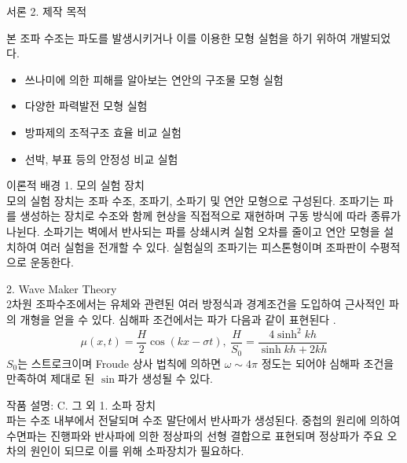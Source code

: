 \documentclass[Junlampaper, portrait]{Julam_PosterK}
\begin{document}
\begin{poster}
\begin{posterbox}[name=intro,column=0]{서론}
    \small {2. 제작 목적} \\
        \scriptsize {본 조파 수조는 파도를 발생시키거나 이를 이용한 모형 실험을 하기 위하여 개발되었다. 
          \begin{itemize}
            \item 쓰나미에 의한 피해를 알아보는 연안의 구조물 모형 실험
            \item 다양한 파력발전 모형 실험
            \item 방파제의 조적구조 효율 비교 실험
            \item 선박, 부표 등의 안정성 비교 실험
          \end{itemize}
          }
        \end{posterbox}

\begin{posterbox}[name=theo,column=0,below=intro]{이론적 배경}
   \small {1. 모의 실험 장치\\} %
     \scriptsize {모의 실험 장치는 조파 수조, 조파기, 소파기 및 연안 모형으로 구성된다. 조파기는 파를 생성하는 장치로 수조와 함께 현상을 직접적으로 재현하며 구동 방식에 따라 종류가 나뉜다. 소파기는 벽에서 반사되는 파를 상쇄시켜 실험 오차를 줄이고 연안 모형을 설치하여 여러 실험을 전개할 수 있다. 실험실의 조파기는 피스톤형이며 조파판이 수평적으로 운동한다.\\}
     
   \small {2. Wave Maker Theory\\}
     \scriptsize 2차원 조파수조에서는 유체와 관련된 여러 방정식과 경계조건을 도입하여 근사적인 파의 개형을 얻을 수 있다. 심해파 조건에서는 파가 다음과 같이 표현된다 \cite{ART002413750, ART002785404, dean1991water}.
      \begin{equation*}
         \mu(x,t)=\frac{H}{2}\cos(kx-\sigma t),~\frac{H}{S_0}=\frac{4\sinh^2 kh}{\sinh kh + 2kh}
      \end{equation*}
         $S_0$는 스트로크이며 Froude 상사 법칙에 의하면 $\omega \sim 4\pi$ 정도는 되어야 심해파 조건을 만족하여 제대로 된 $\sin$파가 생성될 수 있다.
\end{posterbox}

\begin{posterbox}[name=wmaker,column=0,below=theo, above=bottom] {작품 설명: C. 그 외}
\small {1. 소파 장치\\}
    \scriptsize {파는 수조 내부에서 전달되며 수조 말단에서 반사파가 생성된다. 중첩의 원리에 의하여 수면파는 진행파와 반사파에 의한 정상파의 선형 결합으로 표현되며 정상파가 주요 오차의 원인이 되므로 이를 위해 소파장치가 필요하다.}\\


\end{posterbox}
\end{poster}
\end{document}
